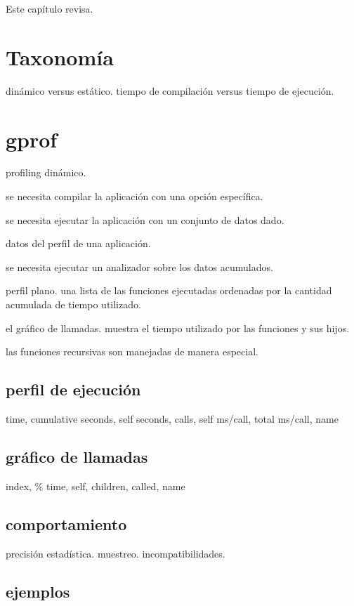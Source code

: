 \documentclass[a4paper]{report}
\begin{document}
Este cap\'itulo revisa.

\section{Taxonom\'ia}

din\'amico versus est\'atico.
tiempo de compilaci\'on versus tiempo de ejecuci\'on.

\section{gprof}

profiling din\'amico.

se necesita compilar la aplicaci\'on con una opci\'on espec\'ifica.

se necesita ejecutar la aplicaci\'on con un conjunto de datos dado.

datos del perfil de una aplicaci\'on.

se necesita ejecutar un analizador sobre los datos acumulados.

perfil plano. una lista de las funciones ejecutadas ordenadas por la cantidad
acumulada de tiempo utilizado.

el gr\'afico de llamadas. muestra el tiempo utilizado por las funciones y sus hijos.

las funciones recursivas son manejadas de manera especial.

\subsection{perfil de ejecuci\'on}

time, cumulative seconds, self seconds, calls, self ms/call, total ms/call, name

\subsection{gr\'afico de llamadas}

index, \% time, self, children, called, name

\subsection{comportamiento}

precisi\'on estad\'istica. muestreo. incompatibilidades.

\subsection{ejemplos}
\end{document}
